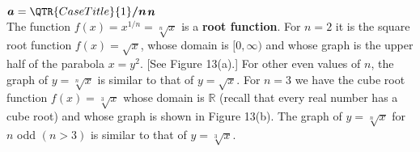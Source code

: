 \documentclass{sebase}
\begin{document}
\noindent {}$%
\mbox{\boldmath $a$}%
=\QTR{CaseTitle}{1}%
\mbox{\boldmath $/n$}%
$$%
\mbox{\boldmath $n$}%
$\\[2pt]
The function $f(x)=x^{1/n}=\sqrt[n]{x}$ is a \textbf{root function}. For $%
n=2 $ it is the square root function $f(x)=\sqrt{x}$, whose domain is $%
[0,\infty )$ and whose graph is the upper half of the parabola $x=y^{2}$.
[See Figure 13(a).] For other even values of $n$, the graph of $y=\sqrt[n]{x}
$ is similar to that of $y=\sqrt{x}$. For $n=3$ we have the cube root
function $f(x)=\sqrt[3]{x}$ whose domain is $\mathbb{R}$ (recall that every
real number has a cube root) and whose graph is shown in Figure 13(b). The
graph of $y=\sqrt[n]{x}$ for $n$ odd $(n>3)$ is similar to that of $y=\sqrt[3%
]{x}$.\\[4pt]
\hspace*{\fill}\hspace*{\fill}\vspace{8pt}
\end{document}
